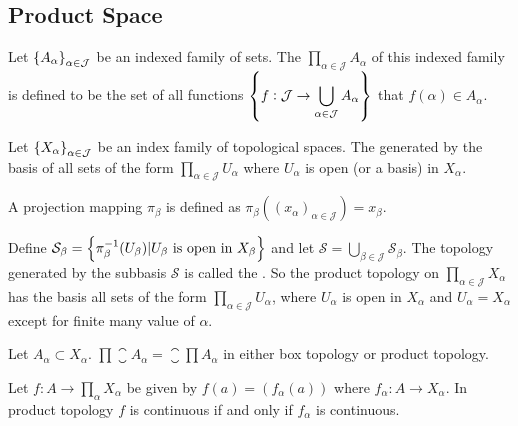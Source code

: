 \subsection{Product Space}

\begin{definition}
    Let $\set{A_{\alpha}}_{\alpha \in \mathcal{J}}$ be an indexed family of sets. The  $\displaystyle \prod_{\alpha \in \mathcal{J}} A_{\alpha}$ of this indexed family is defined to be the set of all functions $\set{f : \mathcal{J} \rightarrow \displaystyle \bigcup_{\alpha \in \mathcal{J}} A_{\alpha}}$ that $f(\alpha) \in A_{\alpha}$.
\end{definition}

\begin{definition}
    Let $\set{X_{\alpha}}_{\alpha \in \mathcal{J}}$ be an index family of topological spaces. The  generated by the basis of all sets of the form $\displaystyle \prod_{\alpha \in \mathcal{J}} U_{\alpha}$ where $U_{\alpha}$ is open (or a basis) in $X_{\alpha}$. 
\end{definition}

\begin{definition}
    A projection mapping $\pi_\beta$ is defined as $\pi_\beta \left( (x_{\alpha})_{\alpha \in \mathcal{J}} \right) = x_\beta$.
\end{definition}

\begin{definition}
    Define $\mathcal{S}_{\beta} = \set{\pi_{\beta}^{-1}(U_{\beta}) | U_{\beta}\text{ is open in }X_{\beta}}$ and let $\mathcal{S} = \displaystyle \bigcup_{\beta \in \mathcal{J}} \mathcal{S}_{\beta}$. The topology generated by the subbasis $\mathcal{S}$ is called the . So the product topology on $\displaystyle \prod_{\alpha \in \mathcal{J}} X_{\alpha}$ has the basis all sets of the form $\displaystyle \prod_{\alpha \in \mathcal{J}} U_{\alpha}$, where $U_{\alpha}$ is open in $X_{\alpha}$ and $U_{\alpha} = X_{\alpha}$ except for finite many value of $\alpha$.
\end{definition}

\begin{theorem}
Let $A_{\alpha} \subset X_{\alpha}$. $\displaystyle \prod \closure{A_{\alpha}} = \closure{\prod A_{\alpha}}$ in either box topology or product topology.
\end{theorem}


\begin{theorem}
Let $\displaystyle f : A \rightarrow \prod_{\alpha} X_{\alpha}$ be given by $f(a) = \left( f_{\alpha}(a) \right)$ where $f_{\alpha} : A \rightarrow X_{\alpha}$. In product topology $f$ is continuous if and only if $f_{\alpha}$ is continuous.
\end{theorem}

